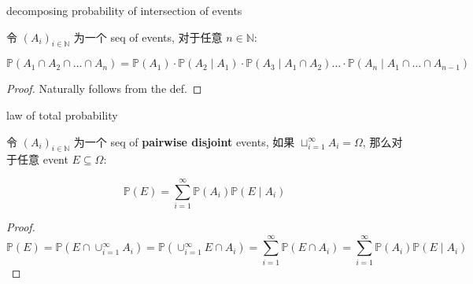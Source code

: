 \documentclass{qlnotes-export}
\begin{document}
\begin{proposition}{decomposing probability of intersection of events}\label{prop-01-combinatorics-prob-space-decomposing-probability-of-intersection-of-events}

令 \(\left( A_{i} \right)_{i \in {\mathbb{N}}}\) 为一个 seq of events, 对于任意 \(n \in {\mathbb{N}}\):

\[{\mathbb{P}}\left( {A_{1} \cap A_{2} \cap \ldots \cap A_{n}} \right) = {\mathbb{P}}\left( A_{1} \right) \cdot {\mathbb{P}}\left( {A_{2} \mid A_{1}} \right) \cdot {\mathbb{P}}\left( {A_{3} \mid A_{1} \cap A_{2}} \right)\ldots \cdot {\mathbb{P}}\left( {A_{n} \mid A_{1} \cap \ldots \cap A_{n - 1}} \right)\]

\end{proposition}

\begin{proof}

Naturally follows from the def.

\end{proof}

\begin{theorem}{law of total probability}\label{thm-01-combinatorics-prob-space-law-of-total-probability}

令 \(\left( A_{i} \right)_{i \in {\mathbb{N}}}\) 为一个 seq of \textbf{pairwise disjoint} events, 如果 \(\sqcup_{i = 1}^{\infty}A_{i} = \Omega\), 那么对于任意 event \(E \subseteq \Omega\):

\[{\mathbb{P}}(E) = \sum\limits_{i = 1}^{\infty}{\mathbb{P}}\left( A_{i} \right){\mathbb{P}}\left( {E \mid A_{i}} \right)\]

\end{theorem}

\begin{proof}

\[{\mathbb{P}}(E) = {\mathbb{P}}\left( {E \cap \cup_{i = 1}^{\infty}A_{i}} \right) = {\mathbb{P}}\left( {\cup_{i = 1}^{\infty}E \cap A_{i}} \right) = \sum\limits_{i = 1}^{\infty}{\mathbb{P}}\left( {E \cap A_{i}} \right) = \sum\limits_{i = 1}^{\infty}{\mathbb{P}}\left( A_{i} \right){\mathbb{P}}\left( {E \mid A_{i}} \right)\]

\end{proof}
\end{document}

